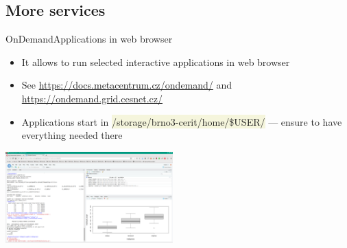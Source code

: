 \documentclass[compress, xelatex, 11pt, xcolor=svgnames, aspectratio=169,
	hyperref={
		bookmarks=true,
		unicode=true,
		colorlinks=true,
		pdftitle={Linux, command line and MetaCentrum},
		plainpages=false,
		pdfauthor={Vojtech Zeisek},
		pdfsubject={Course about use of Linux command line, writing shell scripts and using MetaCentrum of CESNET},
		pdfcreator={XeLaTeX},
		pdfkeywords={Linux, GNU, BASH, shell, command line, MetaCentrum},
		linkcolor=DarkRed, %
		anchorcolor=DarkBlue, %
		citecolor=Indigo, %
		filecolor=NavyBlue, %
		menucolor=DarkMagenta, %
		urlcolor=DarkBlue, %
		},
	url={hyphens, lowtilde} %
	]{beamer}
\renewcommand{\texttt}[1]{\colorbox{Beige}{{\ttfamily #1}}}
\begin{document}

\subsection{More services}

\begin{frame}{OnDemand}{Applications in web browser}
	\begin{itemize}
		\item It allows to run selected interactive applications in web browser
		\item See \url{https://docs.metacentrum.cz/ondemand/} and \url{https://ondemand.grid.cesnet.cz/}
		\item Applications start in \texttt{/storage/brno3-cerit/home/\$USER/} --- ensure to have everything needed there
	\end{itemize}
	\begin{center}
		\includegraphics[height=3.5cm]{rstudio_ondemand.png}
	\end{center}
\end{frame}
\end{document}
